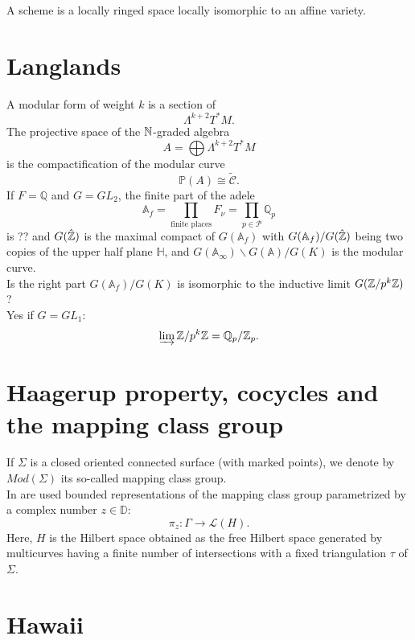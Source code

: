 \begin{definition}
A scheme is a locally ringed space locally isomorphic to an affine variety.
\end{definition}

\section{Langlands}

A modular form of weight $k$ is a section of 
\[\Lambda^{k+2}T^*M.\]
The projective space of the $\mathbb N$-graded algebra \[A=\bigoplus \Lambda^{k+2}T^*M\] is the compactification of the modular curve
\[\mathbb P(A) \cong \tilde{\mathcal C}.\]
If $F=\mathbb Q$ and $G= GL_2$, the finite part of the adele
\[\mathbb A_f = \prod_{\text{finite places}} F_\nu = \prod_{p \in \mathcal P} \mathbb Q_p\]
is ?? and $G(\hat{\mathbb Z})$ is the maximal compact of $G(\mathbb A_f)$ with $G(\mathbb A_f ) / G(\hat {\mathbb Z})$ being two copies of the upper half plane $\mathbb H$, and $G(\mathbb A_\infty) \backslash G(\mathbb A) / G(K)$ is the modular curve.\\

Is the right part $G(\mathbb A_f)/ G(K)$ is isomorphic to the inductive limit $G(\mathbb Z / p^k \mathbb Z)$ ?\\

Yes if $G= GL_1$: \[ \varinjlim \mathbb Z / p^k \mathbb Z = \mathbb Q_p / \mathbb Z_p.\]

\section{Haagerup property, cocycles and the mapping class group}

If $\Sigma$ is a closed oriented connected surface (with marked points), we denote by $Mod(\Sigma)$ its so-called mapping class group.\\

In \cite{CostantinoMartelli} are used bounded representations of the mapping class group parametrized by a complex number $z\in \mathbb D$:
\[\pi_z : \Gamma \rightarrow \mathcal L(H).\]
Here, $H$ is the Hilbert space obtained as the free Hilbert space generated by multicurves having a finite number of intersections with a fixed triangulation $\tau$ of $\Sigma$. 

\section{Hawaii}

